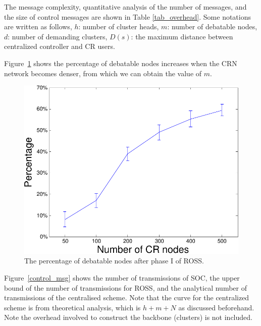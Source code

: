 \documentclass[10pt,journal,compsoc]{IEEEtran}
\theoremstyle{mytheoremstyle}
\theoremstyle{mytheoremstyle}
\theoremstyle{mytheoremstyle}
\begin{document}

The message complexity, quantitative analysis of the number of messages, and the size of control messages are shown in Table \ref{tab_overhead}.
Some notations are written as follows,  $h$: number of cluster heads, $m$: number of debatable nodes, $d$: number of demanding clusters, $D(s)$: the maximum distance between centralized controller and CR users.

Figure~\ref{percentage_overlapping_node} shows the percentage of debatable nodes increases when the CRN network becomes denser, from which we can obtain the value of $m$.
\begin{figure}[ht!]
  \centering
  \includegraphics[width=0.7\linewidth]{percentage_overlapping_node.pdf}
  \caption{The percentage of debatable nodes after phase I of ROSS.}\label{percentage_overlapping_node}
\end{figure}


Figure~\ref{control_msg} shows the number of transmissions of SOC, the upper bound of the number of transmissions for ROSS, and the analytical number of transmissions of the centralised scheme. 
Note that the curve for the centralized scheme is from theoretical analysis, which is $h+m+N$ as discussed beforehand.
Note the overhead involved to construct the backbone (clusters) is not included.
\end{document}
